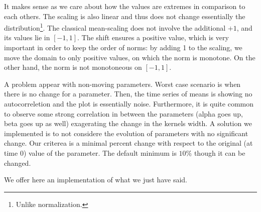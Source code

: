 \documentclass[11pt]{book}
\begin{document}
It makes sense as we care about how the values are extremes in comparison to each others. The scaling is also linear and thus does not change essentially the distribution\footnote{Unlike normalization.}. The classical mean-scaling does not involve the additional $+1$, and its values lie in $[-1,1]$. The shift ensures a positive value, which is very important in order to keep the order of norms: by adding 1 to the scaling, we move the domain to only positive values, on which the norm is monotone. On the other hand, the norm is not monotoneous on $[-1,1]$.


A problem appear with non-moving parameters. Worst case scenario is when there is no change for a parameter. Then, the time series of means is showing no autocorreletion and the plot is essentially noise. Furthermore, it is quite common to observe some strong correlation in between the parameters (alpha goes up, beta goes up as well) exagerating the change in the kernels width. A solution we implemented is to not considere the evolution of parameters with no significant change. Our criterea is a minimal percent change with respect to the original (at time 0) value of the parameter. The default minimum is $10\%$ though it can be changed.


We offer here an implementation of what we just have said. 
\end{document}
